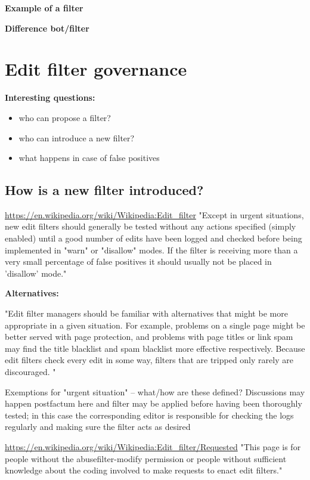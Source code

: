 \documentclass{sigchi}
\begin{document}
\textbf{Example of a filter}

\textbf{Difference bot/filter}

\section{Edit filter governance}

\textbf{Interesting questions:}

\begin{itemize}
    \item who can propose a filter?
    \item who can introduce a new filter?
    \item what happens in case of false positives
\end{itemize}

\subsection{How is a new filter introduced?}
\url{https://en.wikipedia.org/wiki/Wikipedia:Edit_filter}
"Except in urgent situations, new edit filters should generally be tested without any actions specified (simply enabled) until a good number of edits have been logged and checked before being implemented in "warn" or "disallow" modes. If the filter is receiving more than a very small percentage of false positives it should usually not be placed in 'disallow' mode."

\textbf{Alternatives:}

"Edit filter managers should be familiar with alternatives that might be more appropriate in a given situation. For example, problems on a single page might be better served with page protection, and problems with page titles or link spam may find the title blacklist and spam blacklist more effective respectively. Because edit filters check every edit in some way, filters that are tripped only rarely are discouraged. "

Exemptions for "urgent situation" -- what/how are these defined?
Discussions may happen postfactum here and filter may be applied before having been thoroughly tested; in this case the corresponding editor is responsible for checking the logs regularly and making sure the filter acts as desired


\url{https://en.wikipedia.org/wiki/Wikipedia:Edit_filter/Requested}
"This page is for people without the abusefilter-modify permission or people without sufficient knowledge about the coding involved to make requests to enact edit filters."
\end{document}
